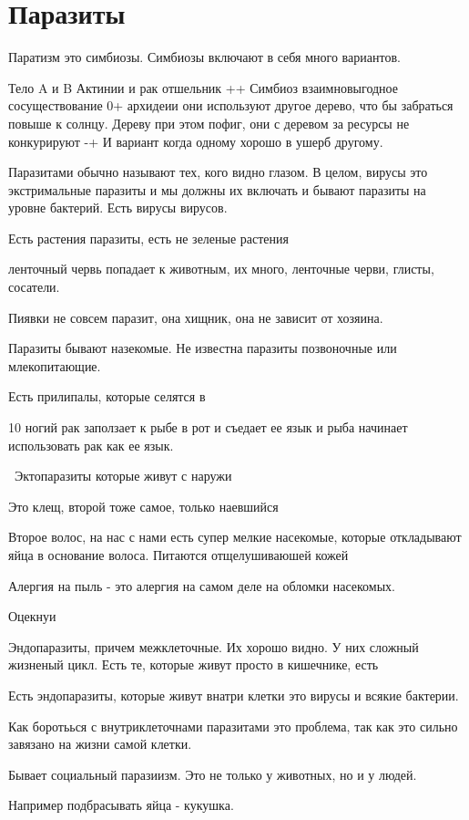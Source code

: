 ﻿\section{Паразиты}
Паратизм это симбиозы. Симбиозы включают 
в себя много вариантов. 

Тело A и B
Актинии и рак отшельник ++
Симбиоз взаимновыгодное сосуществование
0+ архидеии они используют другое дерево, что бы 
забраться повыше к солнцу. Дереву при этом пофиг, 
они с деревом за ресурсы не конкурируют
-+ И вариант когда одному хорошо в ушерб другому. 

Паразитами обычно называют тех, кого видно глазом. 
В целом, вирусы это экстримальные паразиты и мы должны
их включать и бывают паразиты на уровне бактерий. Есть вирусы вирусов. 

Есть растения паразиты, есть не зеленые растения 

ленточный червь попадает к животным, их много, 
ленточные черви, глисты, сосатели. 

Пиявки не совсем паразит, она хищник, она не зависит от хозяина. 


Паразиты бывают назекомые. Не известна паразиты позвоночные или 
млекопитающие. 

Есть прилипалы, которые селятся в 


10 ногий рак заползает к рыбе в рот и съедает ее язык и рыба начинает использовать 
рак как ее язык. 

\
Эктопаразиты которые живут с наружи

Это клещ, второй тоже  самое, только наевшийся


Второе волос, на нас с нами есть супер мелкие насекомые, 
которые откладывают яйца в основание волоса. Питаются отщелушиваюшей кожей

Алергия на пыль - это алергия на самом деле на 
обломки насекомых.

Оцекнуи 

Эндопаразиты,
причем межклеточные. Их хорошо видно. У них 
сложный жизненый цикл. Есть те, которые живут просто в кишечнике, 
есть

Есть эндопаразиты, которые живут внатри клетки это вирусы и всякие бактерии. 

Как боротьься с внутриклеточнами паразитами это проблема, так как 
это сильно завязано на жизни самой клетки. 


Бывает социальный паразиизм. Это не только 
у животных, но и у людей. 

Например подбрасывать яйца - кукушка. 

